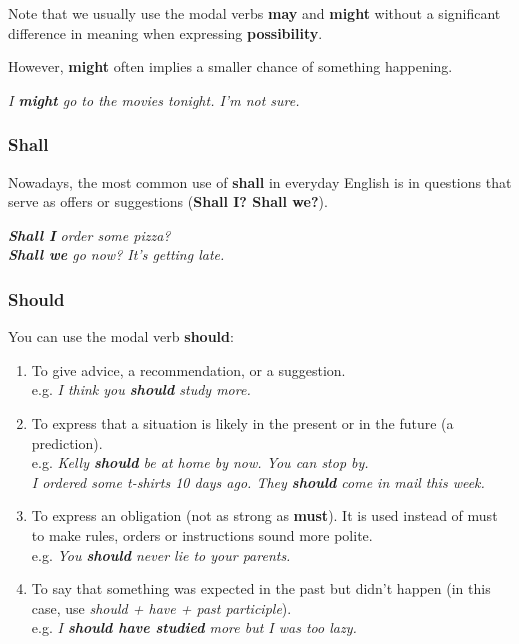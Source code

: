 \documentclass[hidelinks,10pt,a4paper]{article}
\begin{document}
Note that we usually use the modal verbs \textbf{may} and \textbf{might} without a significant difference in meaning when expressing \textbf{possibility}.

However, \textbf{might} often implies a smaller chance of something happening.

\begin{center}
 	\textit{I \textbf{might} go to the movies tonight. I'm not sure.}
 \end{center}

\subsubsection{Shall}
Nowadays, the most common use of \textbf{shall} in everyday English is in questions that serve as offers or suggestions (\textbf{Shall I? Shall we?}).

\begin{center}
	\textit{ \textbf{Shall I} order some pizza? \\
	\textbf{Shall we} go now? It's getting late.}
\end{center}

\subsubsection{Should}
You can use the modal verb \textbf{should}:

\begin{enumerate}[label=(\alph*)]
	\item To give advice, a recommendation, or a suggestion. \\
		e.g. \textit{I think you \textbf{should} study more.}
	\item To express that a situation is likely in the present or in the future (a prediction). \\
		e.g. \textit{Kelly \textbf{should} be at home by now. You can stop by.\\
		I ordered some t-shirts 10 days ago. They \textbf{should} come in mail this week.}
	\item To express an obligation (not as strong as \textbf{must}). It is used instead of must to make rules, orders or instructions sound more polite. \\
		e.g. \textit{You \textbf{should} never lie to your parents.}
	\item To say that something was expected in the past but didn't happen (in this case, use \textit{should + have + past participle}). \\
		e.g. \textit{I \textbf{should have studied} more but I was too lazy.}
\end{enumerate}
\end{document}
